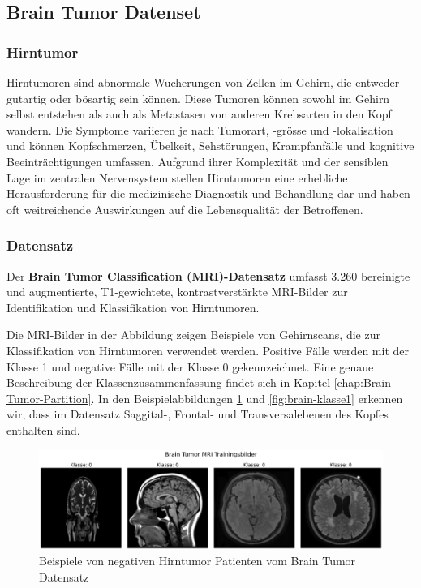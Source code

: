 \subsection{Brain Tumor Datenset} \label{chap:Brain-Tumor}

\subsubsection{Hirntumor} \label{chap:Hirntumor}
Hirntumoren sind abnormale Wucherungen von Zellen im Gehirn, die entweder gutartig oder bösartig sein können. Diese Tumoren können sowohl im Gehirn selbst entstehen als auch als Metastasen von anderen Krebsarten in den Kopf wandern. Die Symptome variieren je nach Tumorart, -grösse und -lokalisation und können Kopfschmerzen, Übelkeit, Sehstörungen, Krampfanfälle und kognitive Beeinträchtigungen umfassen. Aufgrund ihrer Komplexität und der sensiblen Lage im zentralen Nervensystem stellen Hirntumoren eine erhebliche Herausforderung für die medizinische Diagnostik und Behandlung dar und haben oft weitreichende Auswirkungen auf die Lebensqualität der Betroffenen. 


\subsubsection{Datensatz}
Der \textbf{Brain Tumor Classification (MRI)-Datensatz} \cite{bhuvaji_brain_2020} umfasst 3.260 bereinigte und augmentierte, T1-gewichtete, kontrastverstärkte MRI-Bilder zur Identifikation und Klassifikation von Hirntumoren. 

Die MRI-Bilder in der Abbildung zeigen Beispiele von Gehirnscans, die zur Klassifikation von Hirntumoren verwendet werden. Positive Fälle werden mit der Klasse 1 und negative Fälle mit der Klasse 0 gekennzeichnet. Eine genaue Beschreibung der Klassenzusammenfassung findet sich in Kapitel \ref{chap:Brain-Tumor-Partition}. In den Beispielabbildungen \ref{fig:brain-klasse0} und \ref{fig:brain-klasse1} erkennen wir, dass im Datensatz Saggital-, Frontal- und Transversalebenen des Kopfes enthalten sind.

\begin{figure}[ht]
    \centering
    \includegraphics[width=\linewidth]{01-images/03-data/brain-klasse0.png}
    \caption{Beispiele von negativen Hirntumor Patienten vom Brain Tumor Datensatz}
    \label{fig:brain-klasse0}
\end{figure}

